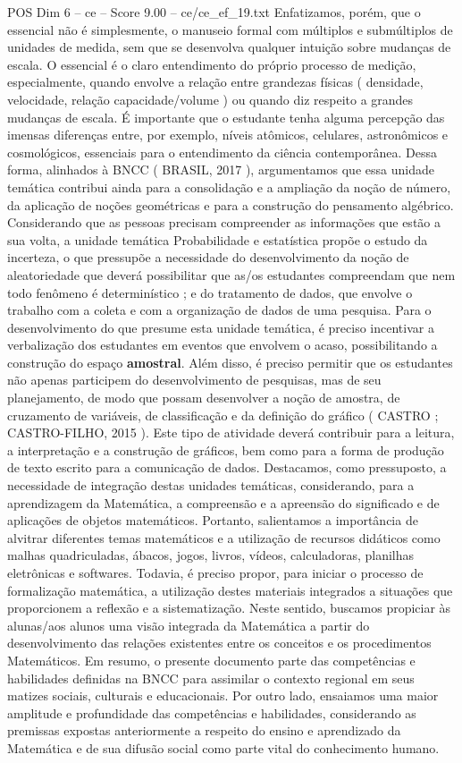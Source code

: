 \begin{textsample}{POS Dim 6 – ce – Score 9.00 – ce/ce\_ef\_19.txt}
Enfatizamos, porém, que o essencial não é simplesmente, o manuseio formal com múltiplos e submúltiplos de unidades de medida, sem que se desenvolva qualquer intuição sobre mudanças de escala.
O essencial é o claro entendimento do próprio processo de medição, especialmente, quando envolve a relação entre grandezas físicas ( densidade, velocidade, relação capacidade/volume ) ou quando diz respeito a grandes mudanças de escala.
É importante que o estudante tenha alguma percepção das imensas diferenças entre, por exemplo, níveis atômicos, celulares, astronômicos e cosmológicos, essenciais para o entendimento da ciência contemporânea.
Dessa forma, alinhados à BNCC ( BRASIL, 2017 ), argumentamos que essa unidade temática contribui ainda para a consolidação e a ampliação da noção de número, da aplicação de noções geométricas e para a construção do pensamento algébrico.
Considerando que as pessoas precisam compreender as informações que estão a sua volta, a unidade temática Probabilidade e estatística propõe o estudo da incerteza, o que pressupõe a necessidade do desenvolvimento da noção de aleatoriedade que deverá possibilitar que as/os estudantes compreendam que nem todo fenômeno é determinístico ; e do tratamento de dados, que envolve o trabalho com a coleta e com a organização de dados de uma pesquisa.
Para o desenvolvimento do que presume esta unidade temática, é preciso incentivar a verbalização dos estudantes em eventos que envolvem o acaso, possibilitando a construção do espaço \textbf{amostral}.
Além disso, é preciso permitir que os estudantes não apenas participem do desenvolvimento de pesquisas, mas de seu planejamento, de modo que possam desenvolver a noção de amostra, de cruzamento de variáveis, de classificação e da definição do gráfico ( CASTRO ; CASTRO-FILHO, 2015 ).
Este tipo de atividade deverá contribuir para a leitura, a interpretação e a construção de gráficos, bem como para a forma de produção de texto escrito para a comunicação de dados.
Destacamos, como pressuposto, a necessidade de integração destas unidades temáticas, considerando, para a aprendizagem da Matemática, a compreensão e a apreensão do significado e de aplicações de objetos matemáticos.
Portanto, salientamos a importância de alvitrar diferentes temas matemáticos e a utilização de recursos didáticos como malhas quadriculadas, ábacos, jogos, livros, vídeos, calculadoras, planilhas eletrônicas e softwares.
Todavia, é preciso propor, para iniciar o processo de formalização matemática, a utilização destes materiais integrados a situações que proporcionem a reflexão e a sistematização.
Neste sentido, buscamos propiciar às alunas/aos alunos uma visão integrada da Matemática a partir do desenvolvimento das relações existentes entre os conceitos e os procedimentos Matemáticos.
Em resumo, o presente documento parte das competências e habilidades definidas na BNCC para assimilar o contexto regional em seus matizes sociais, culturais e educacionais.
Por outro lado, ensaiamos uma maior amplitude e profundidade das competências e habilidades, considerando as premissas expostas anteriormente a respeito do ensino e aprendizado da Matemática e de sua difusão social como parte vital do conhecimento humano.


\end{textsample}
